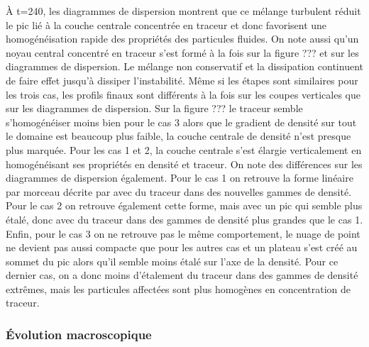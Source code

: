 \documentclass[a4paper,12pt]{article}
\begin{document}
    À t=240, les diagrammes de dispersion montrent que ce mélange turbulent réduit le pic lié à la couche centrale concentrée en traceur et donc favorisent une homogénéisation rapide des propriétés des particules fluides. On note aussi qu'un noyau central concentré en traceur s'est formé à la fois sur la figure ??? et sur les diagrammes de dispersion. Le mélange non conservatif et la dissipation continuent de faire effet jusqu'à dissiper l'instabilité. Même si les étapes sont similaires pour les trois cas, les profils finaux sont différents à la fois sur les coupes verticales que sur les diagrammes de dispersion. Sur la figure ??? le traceur semble s'homogénéiser moins bien pour le cas 3 alors que le gradient de densité sur tout le domaine est beaucoup plus faible, la couche centrale de densité n'est presque plus marquée. Pour les cas 1 et 2, la couche centrale s'est élargie verticalement en homogénéisant ses propriétés en densité et traceur. On note des différences sur les diagrammes de dispersion également. Pour le cas 1 on retrouve la forme linéaire par morceau décrite par \cite{penney_diapycnal_2020} avec du traceur dans des nouvelles gammes de densité. Pour le cas 2 on retrouve également cette forme, mais avec un pic qui semble plus étalé, donc avec du traceur dans des gammes de densité plus grandes que le cas 1. Enfin, pour le cas 3 on ne retrouve pas le même comportement, le nuage de point ne devient pas aussi compacte que pour les autres cas et un plateau s'est créé au sommet du pic alors qu'il semble moins étalé sur l'axe de la densité. Pour ce dernier cas, on a donc moins d'étalement du traceur dans des gammes de densité extrêmes, mais les particules affectées sont plus homogènes en concentration de traceur.
    
    \subsubsection{Évolution macroscopique}
    
\end{document}
